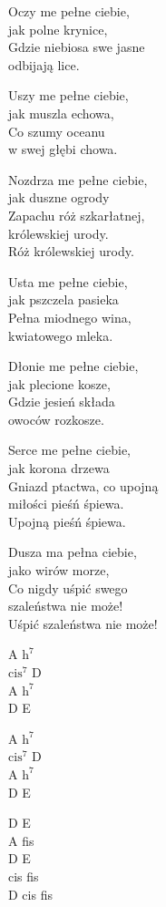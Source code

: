 \begin{text}
    Oczy me pełne ciebie,\\
    jak polne krynice,\\
    Gdzie niebiosa swe jasne\\
    odbijają lice.

    Uszy me pełne ciebie,\\
    jak muszla echowa,\\
    Co szumy oceanu\\
    w swej głębi chowa.

    Nozdrza me pełne ciebie,\\
    jak duszne ogrody\\
    Zapachu róż szkarłatnej,\\
    królewskiej urody.\\
    Róż królewskiej urody.

    Usta me pełne ciebie,\\
    jak pszczela pasieka\\
    Pełna miodnego wina,\\
    kwiatowego mleka.

    Dłonie me pełne ciebie,\\
    jak plecione kosze,\\
    Gdzie jesień składa\\
    owoców rozkosze.

    Serce me pełne ciebie,\\
    jak korona drzewa\\
    Gniazd ptactwa, co upojną\\
    miłości pieśń śpiewa.\\
    Upojną pieśń śpiewa.

    Dusza ma pełna ciebie,\\
    jako wirów morze,\\
    Co nigdy uśpić swego\\
    szaleństwa nie może!\\
    Uśpić szaleństwa nie może!
\end{text}
\begin{chord}
    A $\mathrm{h^{7}}$\\
    $\mathrm{cis^{7}}$ D\\
    A $\mathrm{h^{7}}$\\
    D E

    A $\mathrm{h^{7}}$\\
    $\mathrm{cis^{7}}$ D\\
    A $\mathrm{h^{7}}$\\
    D E

    D E\\
    A fis\\
    D E\\
    cis fis\\
    D cis fis
\end{chord}
